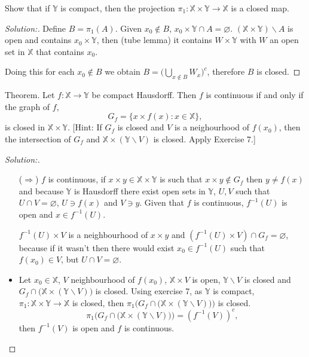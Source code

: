 \documentclass[a4paper,12pt, reqno]{article}
\theoremstyle{definition}
\newenvironment{exerr}[1]{
  \renewcommand\theexeralt{#1}
  \exeralt
}{\endexeralt}
\newenvironment{solution}{\begin{proof}[Solution:]}{\end{proof}}
\newcommand{\X}{\mathbb{X}}
\newcommand{\Y}{\mathbb{Y}}
\begin{document}
\begin{exerr}{7}
  Show that if $\Y$ is compact, then the projection $\pi_{1}:\X\times\Y\to\X$ is a closed map.
\end{exerr}
\begin{solution}
  Define $B = \pi_{1}(A)$. Given $x_{0}\notin B$, $x_{0}\times\Y\cap A = \varnothing$. $(\X\times\Y)\backslash A$ is open and contains $x_{0}\times\Y$, then (tube lemma) it contains $W\times\Y$ with $W$ an open set in $\X$ that contains $x_{0}$.
  
  Doing this for each $x_{0}\notin B$ we obtain $B = \Big( \bigcup_{x\notin B}W_{x} \Big)^c$, therefore $B$ is closed.
\end{solution}

\begin{exerr}{8}
  Theorem. Let $f:\X\to\Y$ be compact Hausdorff. Then $f$ is continuous if and only if the graph of $f$,
  \begin{equation*}
      G_{f} = \{ x\times f(x) : x\in\X \},
  \end{equation*}
  is closed in $\X\times\Y$. [Hint: If $G_{f}$ is closed and $V$ is a neighourhood of $f(x_{0})$, then the intersection of $G_{f}$ and $\X\times(\Y\backslash V)$ is closed. Apply Exercise 7.]
\end{exerr}
\begin{solution}\hfill
  \begin{itemize}
    \item[($\Longrightarrow$)] $f$ is continuous, if $x\times y\in \X\times\Y$ is such that $x\times y\notin G_{f}$ then $y\neq f(x)$ and because $\Y$ is Hausdorff there exist open sets in $\Y$, $U,V$ such that $U\cap V=\varnothing$, $U\ni f(x)$ and $V\ni y$. Given that $f$ is continuous, $f^{-1}(U)$ is open and $x\in f^{-1}(U)$.
    
    $f^{-1}(U)\times V$ is a neighbourhood of $x\times y$ and $(f^{-1}(U)\times V)\cap G_{f} = \varnothing$, because if it wasn't then there would exist $x_{0}\in f^{-1}(U)$ such that $f(x_{0})\in V$, but $U\cap V = \varnothing$.
    \item Let $x_{0}\in\X$, $V$ neighbourhood of $f(x_{0})$, $\X\times V$ is open, $\Y\backslash V$ is closed and $G_{f}\cap\big( \X\times(\Y\backslash V) \big)$ is closed. Using exercise 7, as $\Y$ is compact, $\pi_{1}:\X\times\Y\to\X$ is closed, then $\pi_{1}\big(G_{f}\cap\big( \X\times(\Y\backslash V) \big)\big)$ is closed.
    \begin{equation*}
        \pi_{1}\big(G_{f}\cap\big( \X\times(\Y\backslash V) \big)\big) = (f^{-1}(V))^c,
    \end{equation*}
    then $f^{-1}(V)$ is open and $f$ is continuous.
  \end{itemize}
\end{solution}
\end{document}
